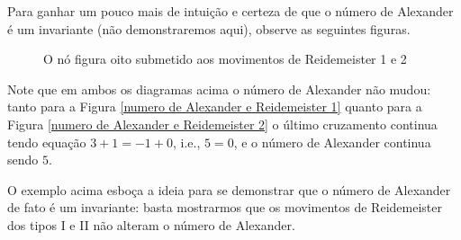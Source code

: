 	\par\vspace{0.3cm} Para ganhar um pouco mais de intuição e certeza de que o número de 
	Alexander é um invariante (não demonstraremos aqui), observe as seguintes figuras.
	\begin{figure}[H]
        \centering
        \hspace{3cm}
        \caption{O nó figura oito submetido aos movimentos de Reidemeister 1 e 2}
    \end{figure}
	Note que em ambos os diagramas acima o número de Alexander não mudou: tanto para a 
	Figura \ref{numero de Alexander e Reidemeister 1} quanto para a 
	Figura \ref{numero de Alexander e Reidemeister 2} o último cruzamento continua tendo 
	equação $3+1=-1+0$, i.e., $5=0$, e o número de Alexander continua sendo $5$.
	
	\par\vspace{0.3cm} O exemplo acima esboça a ideia para se demonstrar que o número de 
	Alexander de fato é um invariante: basta mostrarmos que os movimentos de Reidemeister 
	dos tipos I e II não alteram o número de Alexander.
	
